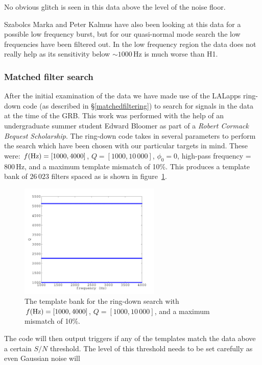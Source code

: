 No obvious glitch is seen in this data above the level of the noise floor.

Szabolcs Marka and Peter Kalmus \cite{Szabi} have also been looking at this data for a possible low
frequency burst, but for our quasi-normal mode search the low frequencies have been filtered out.
In the low frequency region the \geo data does not really help as its sensitivity below $\sim
1000$\,Hz is much worse than H1.

\subsubsection{Matched filter search}
After the initial examination of the data we have made use of the LALapps ring-down code (as
described in \S\ref{matchedfiltering}) to search for signals in the data at the time of the GRB.
This work was performed with the help of an undergraduate summer student Edward Bloomer as part of
a {\it Robert Cormack Bequest Scholarship}. The ring-down code takes in several parameters to
perform the search which have been chosen with our particular targets in mind. These were: $f ({\rm
 Hz}) = [1000, 4000]$, $Q = [1000, 10\,000]$, $\phi_0 = 0$, high-pass frequency = 800\,Hz, and a
maximum template mismatch of 10\%. This produces a template bank of $26\,023$ filters spaced as is
shown in figure~\ref{SGRTemplateBank}. 
\begin{figure}[!htbp]
\begin{center}
\includegraphics[width=0.6\textwidth]{figs/SGRTemplateBank}\caption{The template bank
for the ring-down search with $f ({\rm Hz}) = [1000, 4000]$, $Q = [1000, 10\,000]$, and a maximum
mismatch of 10\%.}\label{SGRTemplateBank}
\end{center}
\end{figure}
The code will then output triggers if any of the templates match the data above a certain $S/N$
threshold. The level of this threshold needs to be set carefully as even Gaussian noise will
